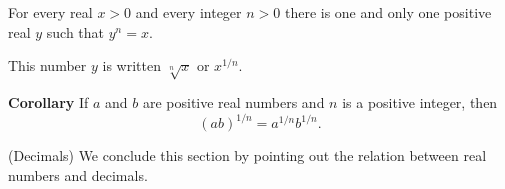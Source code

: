 \begin{thm}\label{thm:1.21}
    For every real $x > 0$ and every integer $n> 0$ there is one and only one positive real $y$ such that $y^n = x$.
\end{thm}

This number $y$ is written $\sqrt[n]{x}$ or $x^{1/n}$.

\textbf{Corollary} If $a$ and $b$ are positive real numbers and $n$ is a positive integer, then
\begin{equation*}
    (ab)^{1/n}= a^{1/n}b^{1/n}.
\end{equation*}

\begin{myDef}(Decimals)
    We conclude this section by pointing out the relation between real numbers and decimals.
\end{myDef}

